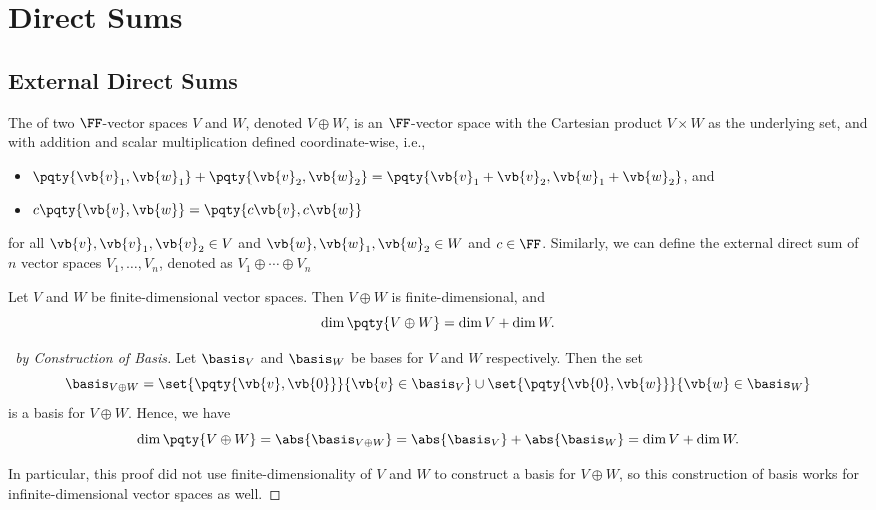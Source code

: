 \section{Direct Sums}

\subsection{External Direct Sums}

\begin{definition}
    The  of two \(\FF\)-vector spaces \(V\) and \(W\), denoted \(V \oplus W\), is an \(\FF\)-vector space with the Cartesian product \(V \times W\) as the underlying set, and with addition and scalar multiplication defined coordinate-wise, i.e.,
    \begin{itemize}
        \item \(\pqty{\vb{v}_1, \vb{w}_1} + \pqty{\vb{v}_2, \vb{w}_2} = \pqty{\vb{v}_1 + \vb{v}_2, \vb{w}_1 + \vb{w}_2}\), and
        \item \(c \pqty{\vb{v}, \vb{w}} = \pqty{c\vb{v}, c\vb{w}}\)
    \end{itemize}
    for all \(\vb{v}, \vb{v}_1, \vb{v}_2 \in V\) and \(\vb{w}, \vb{w}_1, \vb{w}_2 \in W\) and \(c \in \FF\). Similarly, we can define the external direct sum of \(n\) vector spaces \(V_1, \ldots, V_n\), denoted as \(V_1 \oplus \cdots \oplus V_n\)
\end{definition}

\begin{lemma}
    \label{lem:dimension-of-direct-sum}%
    Let \(V\) and \(W\) be finite-dimensional vector spaces. Then \(V \oplus W\) is finite-dimensional, and
    \[
        \dim \pqty{V \oplus W} = \dim V + \dim W.
    \]
\end{lemma}

\begin{proof}[\proofname\ by Construction of Basis]
    Let \(\basis_V\) and \(\basis_W\) be bases for \(V\) and \(W\) respectively. Then the set
    \[
        \basis_{V \oplus W} = \set{\pqty{\vb{v}, \vb{0}}}{\vb{v} \in \basis_V} \cup \set{\pqty{\vb{0}, \vb{w}}}{\vb{w} \in \basis_W}
    \]
    is a basis for \(V \oplus W\). Hence, we have
    \[
        \dim \pqty{V \oplus W} = \abs{\basis_{V \oplus W}} = \abs{\basis_V} + \abs{\basis_W} = \dim V + \dim W.
    \]

    In particular, this proof did not use finite-dimensionality of \(V\) and \(W\) to construct a basis for \(V \oplus W\), so this construction of basis works for infinite-dimensional vector spaces as well.
\end{proof}


